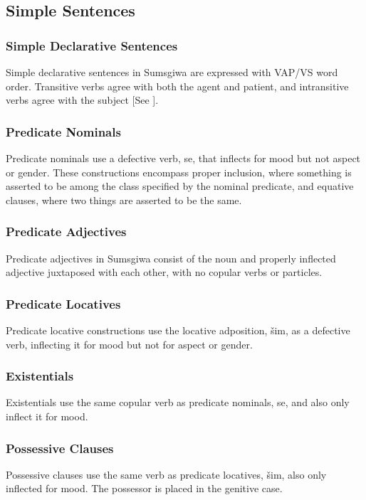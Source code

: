 \subsection{Simple Sentences}

\subsubsection{Simple Declarative Sentences}
Simple declarative sentences in Sumsgiwa are expressed with VAP/VS word order. Transitive verbs agree with both the agent and patient, and intransitive verbs agree with the subject [See ].

\subsubsection{Predicate Nominals} \label{04_05_02_Predicate Nominals}
Predicate nominals use a defective  verb, \textlangle se\textrangle, that inflects for mood but not aspect or gender. These constructions encompass proper inclusion, where something is asserted to be among the class specified by the nominal predicate, and equative clauses, where two things are asserted to be the same.

\subsubsection{Predicate Adjectives}
Predicate adjectives in Sumsgiwa consist of the noun and properly inflected adjective juxtaposed with each other, with no copular verbs or particles.

\subsubsection{Predicate Locatives}
Predicate locative constructions use the locative adposition, \textlangle \v{s}im\textrangle, as a defective verb, inflecting it for mood but not for aspect or gender.

\subsubsection{Existentials}
Existentials use the same copular verb as predicate nominals, \textlangle se\textrangle, and also only inflect it for mood.

\subsubsection{Possessive Clauses}
Possessive clauses use the same verb as predicate locatives, \textlangle \v{s}im\textrangle, also only inflected for mood. The possessor is placed in the genitive case.
